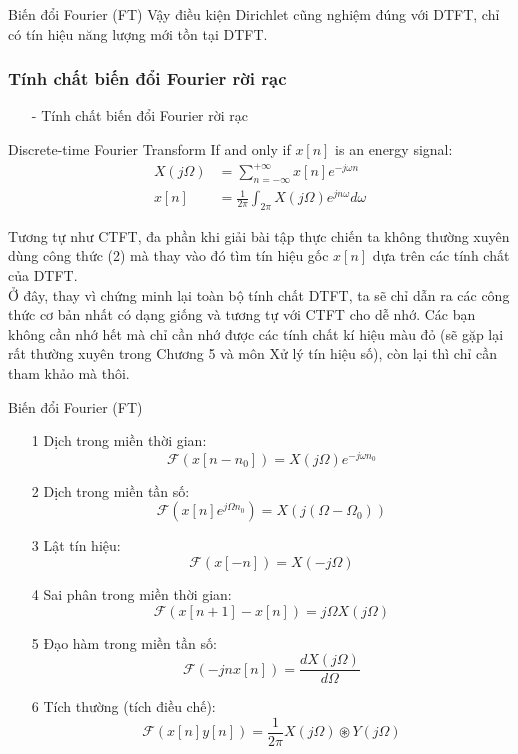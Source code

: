 \documentclass[8pt]{beamer}
\begin{document}
\begin{frame}{Biến đổi Fourier (FT)}
Vậy điều kiện Dirichlet cũng nghiệm đúng với DTFT, chỉ có tín hiệu năng lượng mới tồn tại DTFT.
\subsubsection{Tính chất biến đổi Fourier rời rạc}
\begin{itemize}
	\item[-] Tính chất biến đổi Fourier rời rạc
\end{itemize}
\begin{block}{Discrete-time Fourier Transform}
If and only if $x[n]$ is \alert{an energy signal}:
\begin{equation*}
	\begin{split}
X(j\Omega)&=\sum_{n=-\infty}^{+\infty}x[n]e^{-j\omega n}\\
x[n]&=\frac{1}{2\pi}\int_{2\pi}X(j\Omega)e^{jn\omega}d\omega
\end{split}
\end{equation*}
\end{block}
Tương tự như CTFT, đa phần khi giải bài tập thực chiến ta không thường xuyên dùng công thức (2) mà thay vào đó tìm tín hiệu gốc $x[n]$ dựa trên các tính chất của DTFT.
\\ Ở đây, thay vì chứng minh lại toàn bộ tính chất DTFT, ta sẽ chỉ dẫn ra các công thức cơ bản nhất có dạng giống và tương tự với CTFT cho dễ nhớ. Các bạn không cần nhớ hết mà chỉ cần nhớ được các tính chất kí hiệu màu đỏ (sẽ gặp lại rất thường xuyên trong \alert{Chương 5} và môn Xử lý tín hiệu số), còn lại thì chỉ cần tham khảo mà thôi.
\end{frame}
\begin{frame}{Biến đổi Fourier (FT)}
\begin{enumerate}
	\item[1] \alert{Dịch trong miền thời gian:}
\alert{$$\mathscr{F}(x[n-n_{0}])=X(j\Omega)e^{-j\omega n_{0}}$$}
\item[2] \alert{Dịch trong miền tần số: }
	\alert{$$\mathscr{F}(x[n]e^{j\Omega n_{0}})=X(j(\Omega-\Omega_{0}))$$}
\item[3] \alert{Lật tín hiệu:}
	\alert{$$\mathscr{F}(x[-n])=X(-j\Omega)$$}
\item[4] Sai phân trong miền thời gian:
	$$\mathscr{F}(x[n+1]-x[n])=j\Omega X(j\Omega)$$
\item[5] \alert{Đạo hàm trong miền tần số:}
	\alert{$$\mathscr{F}(-jnx[n])=\frac{dX(j\Omega)}{d\Omega}$$}
\item[6] Tích thường (tích điều chế):
	$$\mathscr{F}(x[n]y[n])=\frac{1}{2\pi}X(j\Omega)\circledast Y(j\Omega)$$
\end{enumerate}
\end{frame}
\end{document}
